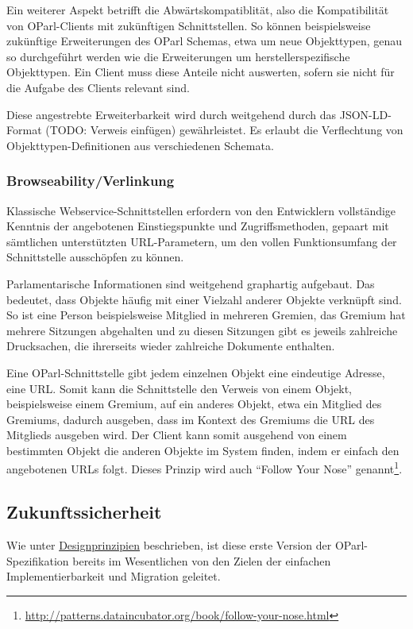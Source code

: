 \documentclass[,a4paper]{article}
\begin{document}
Ein weiterer Aspekt betrifft die Abwärtskompatiblität, also die
Kompatibilität von OParl-Clients mit zukünftigen Schnittstellen. So
können beispielsweise zukünftige Erweiterungen des OParl Schemas, etwa
um neue Objekttypen, genau so durchgeführt werden wie die Erweiterungen
um herstellerspezifische Objekttypen. Ein Client muss diese Anteile
nicht auswerten, sofern sie nicht für die Aufgabe des Clients relevant
sind.

Diese angestrebte Erweiterbarkeit wird durch weitgehend durch das
JSON-LD-Format (TODO: Verweis einfügen) gewährleistet. Es erlaubt die
Verflechtung von Objekttypen-Definitionen aus verschiedenen Schemata.

\subsubsection{Browseability/Verlinkung}

Klassische Webservice-Schnittstellen erfordern von den Entwicklern
vollständige Kenntnis der angebotenen Einstiegspunkte und
Zugriffsmethoden, gepaart mit sämtlichen unterstützten URL-Parametern,
um den vollen Funktionsumfang der Schnittstelle ausschöpfen zu können.

Parlamentarische Informationen sind weitgehend graphartig aufgebaut. Das
bedeutet, dass Objekte häufig mit einer Vielzahl anderer Objekte
verknüpft sind. So ist eine Person beispielsweise Mitglied in mehreren
Gremien, das Gremium hat mehrere Sitzungen abgehalten und zu diesen
Sitzungen gibt es jeweils zahlreiche Drucksachen, die ihrerseits wieder
zahlreiche Dokumente enthalten.

Eine OParl-Schnittstelle gibt jedem einzelnen Objekt eine eindeutige
Adresse, eine URL. Somit kann die Schnittstelle den Verweis von einem
Objekt, beispielsweise einem Gremium, auf ein anderes Objekt, etwa ein
Mitglied des Gremiums, dadurch ausgeben, dass im Kontext des Gremiums
die URL des Mitglieds ausgeben wird. Der Client kann somit ausgehend von
einem bestimmten Objekt die anderen Objekte im System finden, indem er
einfach den angebotenen URLs folgt. Dieses Prinzip wird auch ``Follow
Your Nose'' genannt\footnote{\url{http://patterns.dataincubator.org/book/follow-your-nose.html}}.

\subsection{Zukunftssicherheit}

Wie unter \hyperref[designprinzipien]{Designprinzipien} beschrieben, ist
diese erste Version der OParl-Spezifikation bereits im Wesentlichen von
den Zielen der einfachen Implementierbarkeit und Migration geleitet.
\end{document}
